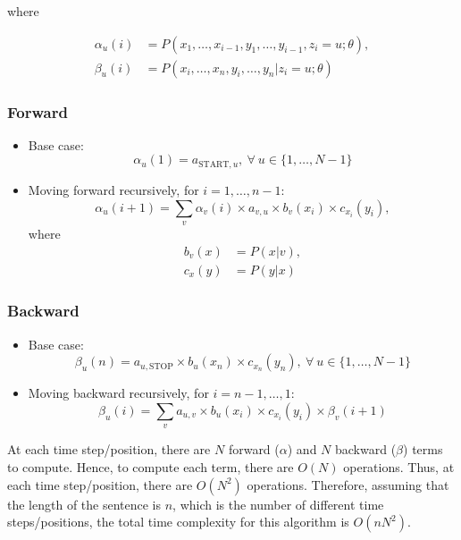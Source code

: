 \documentclass[11pt,fancychapters]{article}
\begin{document}
where

\begin{align*}
	\alpha_u(i) &= P(x_1, \ldots, x_{i-1}, y_1, \ldots, y_{i-1}, z_i = u; \theta), \\
	\beta_u(i) &= P(x_i, \ldots, x_n, y_i, \ldots, y_n | z_i = u; \theta)
\end{align*}

\subsubsection*{Forward}

\begin{itemize}
	\item Base case:
	\begin{equation*}
		\alpha_u(1) = a_{\text{START}, u}, ~ \forall ~ u \in \{ 1, \ldots, N - 1 \}
	\end{equation*}

	\item Moving forward recursively, for $i = 1, \ldots, n - 1$:
	\begin{equation*}
		\alpha_u(i + 1) = \sum_v \alpha_v(i) \times a_{v, u} \times b_v(x_i) \times c_{x_i}(y_i),
	\end{equation*}
	where
	\begin{align*}
		b_v(x) &= P(x | v), \\
		c_x(y) &= P(y | x)
	\end{align*}
\end{itemize}

\subsubsection*{Backward}

\begin{itemize}
	\item Base case:
	\begin{equation*}
		\beta_u(n) = a_{u, \text{STOP}} \times b_u(x_n) \times c_{x_n}(y_n), ~ \forall ~ u \in \{ 1, \ldots, N - 1 \}
	\end{equation*}
	
	\item Moving backward recursively, for $i = n - 1, \ldots, 1$:
	\begin{equation*}
		\beta_u(i) = \sum_v a_{u, v} \times b_u(x_i) \times c_{x_i}(y_i) \times \beta_v(i + 1)
	\end{equation*}
\end{itemize}

At each time step/position, there are $N$ forward ($\alpha$) and $N$ backward ($\beta$) terms to compute. Hence, to compute each term, there are $O(N)$ operations. Thus, at each time step/position, there are $O(N^2)$ operations. Therefore, assuming that the length of the sentence is $n$, which is the number of different time steps/positions, the total time complexity for this algorithm is $O(nN^2)$.
\end{document}
